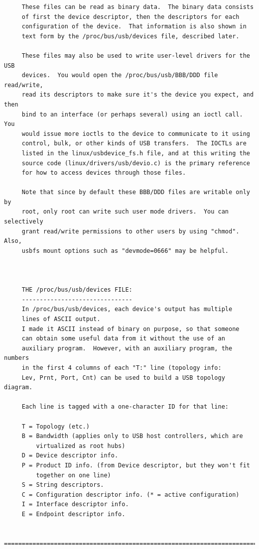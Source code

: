 \begin{verbatim}
     These files can be read as binary data.  The binary data consists
     of first the device descriptor, then the descriptors for each
     configuration of the device.  That information is also shown in
     text form by the /proc/bus/usb/devices file, described later.
     
     These files may also be used to write user-level drivers for the USB
     devices.  You would open the /proc/bus/usb/BBB/DDD file read/write,
     read its descriptors to make sure it's the device you expect, and then
     bind to an interface (or perhaps several) using an ioctl call.  You
     would issue more ioctls to the device to communicate to it using
     control, bulk, or other kinds of USB transfers.  The IOCTLs are
     listed in the linux/usbdevice_fs.h file, and at this writing the
     source code (linux/drivers/usb/devio.c) is the primary reference
     for how to access devices through those files.
     
     Note that since by default these BBB/DDD files are writable only by
     root, only root can write such user mode drivers.  You can selectively
     grant read/write permissions to other users by using "chmod".  Also,
     usbfs mount options such as "devmode=0666" may be helpful.
     
     
     
     THE /proc/bus/usb/devices FILE:
     -------------------------------
     In /proc/bus/usb/devices, each device's output has multiple
     lines of ASCII output.
     I made it ASCII instead of binary on purpose, so that someone
     can obtain some useful data from it without the use of an
     auxiliary program.  However, with an auxiliary program, the numbers
     in the first 4 columns of each "T:" line (topology info:
     Lev, Prnt, Port, Cnt) can be used to build a USB topology diagram.
     
     Each line is tagged with a one-character ID for that line:
     
     T = Topology (etc.)
     B = Bandwidth (applies only to USB host controllers, which are
         virtualized as root hubs)
     D = Device descriptor info.
     P = Product ID info. (from Device descriptor, but they won't fit
         together on one line)
     S = String descriptors.
     C = Configuration descriptor info. (* = active configuration)
     I = Interface descriptor info.
     E = Endpoint descriptor info.
     
     =======================================================================
     

\end{verbatim}
